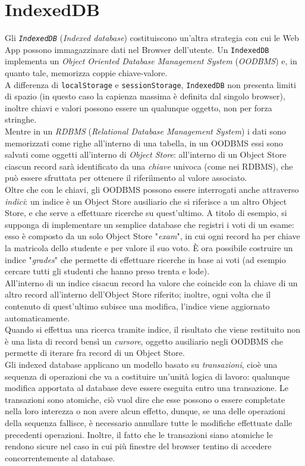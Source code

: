 \documentclass[a4paper, 12pt, twoside, openright]{book}
\begin{document}
\section{IndexedDB} %
Gli \textit{\texttt{IndexedDB}} (\textit{Indexed database}) costituiscono un'altra strategia con cui le Web App possono immagazzinare dati nel Browser dell'utente. Un \texttt{IndexedDB} implementa un \textit{Object Oriented Database Management System} (\textit{OODBMS}) e, in quanto tale, memorizza coppie chiave-valore.\\
A differenza di \texttt{localStorage} e \texttt{sessionStorage}, \texttt{IndexedDB} non presenta limiti di spazio (in questo caso la capienza massima è definita dal singolo browser), inoltre chiavi e valori possono essere un qualunque oggetto, non per forza stringhe.\\
Mentre in un \textit{RDBMS} (\textit{Relational Database Management System}) i dati sono memorizzati come righe all'interno di una tabella, in un OODBMS essi sono salvati come oggetti all'interno di \textit{Object Store}: all'interno di un Object Store ciascun record sarà identificato da una \textit{chiave} univoca (come nei RDBMS), che può essere sfruttata per ottenere il riferiìmento al valore associato.\\
Oltre che con le chiavi, gli OODBMS possono essere interrogati anche attraverso \textit{indici}: un indice è un Object Store ausiliario che si riferisce a un altro Object Store, e che serve a effettuare ricerche su quest'ultimo. A titolo di esempio, si supponga di implementare un semplice database che registri i voti di un esame: esso è composto da un solo Object Store "\textit{exam}", in cui ogni record ha per chiave la matricola dello studente e per valore il suo voto. È ora possibile costruire un indice "\textit{grades}" che permette di effettuare ricerche in base ai voti (ad esempio cercare tutti gli studenti che hanno preso trenta e lode).\\
All'interno di un indice cisacun record ha valore che coincide con la chiave di un altro record all'interno dell'Object Store riferito; inoltre, ogni volta che il contenuto di quest'ultimo subisce una modifica, l'indice viene aggiornato automaticamente.\\
Quando si effettua una ricerca tramite indice, il risultato che viene restituito non è una lista di record bensì un \textit{cursore}, oggetto ausiliario negli OODBMS che permette di iterare fra record di un Object Store.\\
Gli indexed database applicano un modello basato su \textit{transazioni}, cioè una sequenza di operazioni che va a costituire un'unità logica di lavoro: qualunque modifica apportata al database deve essere eseguita entro una transazione. Le transazioni sono atomiche, ciò vuol dire che esse possono o essere completate nella loro interezza o non avere alcun effetto, dunque, se una delle operazioni della sequenza fallisce, è necessario annullare tutte le modifiche effettuate dalle precedenti operazioni. Inoltre, il fatto che le transazioni siano atomiche le rendono sicure nel caso in cui più finestre del browser tentino di accedere concorrentemente al database.\\
\end{document}
